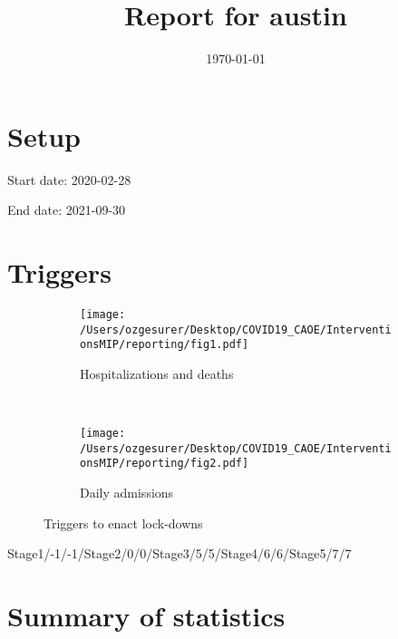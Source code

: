 \documentclass{article}
\title{Report for austin}
\author{}
\date{\today}
\begin{document}
\maketitle

\section*{Setup}

Start date: 2020-02-28

End date: 2021-09-30 




\section*{Triggers}
\begin{figure}[!htb]
  \centering
  \setlength{\unitlength}{1cm}
    \begin{subfigure}[b]{0.475\linewidth}
    \centering
        \texttt{[image: /Users/ozgesurer/Desktop/COVID19\_CAOE/InterventionsMIP/reporting/fig1.pdf]}
        \caption{Hospitalizations  and deaths}
        \label{fig:IHD}
    \end{subfigure}
    ~
    \begin{subfigure}[b]{0.475\linewidth}
    \centering
         \texttt{[image: /Users/ozgesurer/Desktop/COVID19\_CAOE/InterventionsMIP/reporting/fig2.pdf]}
        \caption{Daily admissions}
        \label{fig:IYIH}
    \end{subfigure}
    \caption{Triggers to enact lock-downs}\label{fig:SD90}
\end{figure}

Stage1/-1/-1/Stage2/0/0/Stage3/5/5/Stage4/6/6/Stage5/7/7

\newpage

\section*{Summary of statistics}
\end{document}
